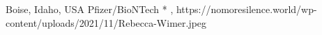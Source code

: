           {
            Boise, Idaho, USA
          }
          {
          }
          {
            Pfizer/BioNTech
          }
          {
            *
          }
          {
            ,
          }
          {
            https://nomoresilence.world/wp-content/uploads/2021/11/Rebecca-Wimer.jpeg
          }

